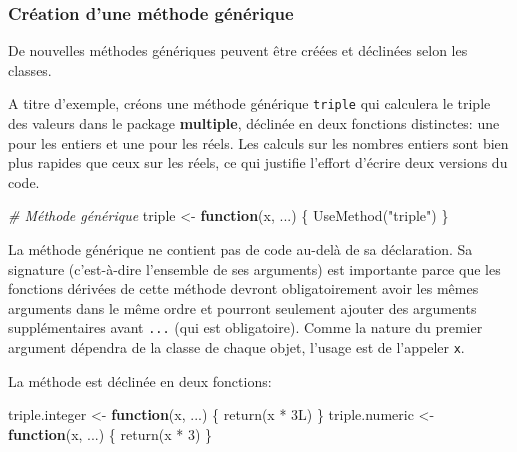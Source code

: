 \documentclass[
  11pt,
  french,
  a4paper,
  extrafontsizes,onecolumn,openright
  ]{memoir}
\newenvironment{Shaded}{\begin{snugshade}}{\end{snugshade}}
\newcommand{\CommentTok}[1]{\textcolor[rgb]{0.56,0.35,0.01}{\textit{#1}}}
\newcommand{\ControlFlowTok}[1]{\textcolor[rgb]{0.13,0.29,0.53}{\textbf{#1}}}
\newcommand{\DecValTok}[1]{\textcolor[rgb]{0.00,0.00,0.81}{#1}}
\newcommand{\FunctionTok}[1]{\textcolor[rgb]{0.00,0.00,0.00}{#1}}
\newcommand{\NormalTok}[1]{#1}
\newcommand{\OtherTok}[1]{\textcolor[rgb]{0.56,0.35,0.01}{#1}}
\newcommand{\SpecialCharTok}[1]{\textcolor[rgb]{0.00,0.00,0.00}{#1}}
\newcommand{\StringTok}[1]{\textcolor[rgb]{0.31,0.60,0.02}{#1}}
\begin{document}
\hypertarget{cruxe9ation-dune-muxe9thode-guxe9nuxe9rique}{%
\subsubsection{Création d'une méthode générique}\label{cruxe9ation-dune-muxe9thode-guxe9nuxe9rique}}

De nouvelles méthodes génériques peuvent être créées et déclinées selon les classes.

A titre d'exemple, créons une méthode générique \texttt{triple} qui calculera le triple des valeurs dans le package \textbf{multiple}, déclinée en deux fonctions distinctes: une pour les entiers et une pour les réels.
Les calculs sur les nombres entiers sont bien plus rapides que ceux sur les réels, ce qui justifie l'effort d'écrire deux versions du code.

\scriptsize

\begin{Shaded}
\begin{Highlighting}[]
\CommentTok{\# Méthode générique}
\NormalTok{triple }\OtherTok{\textless{}{-}} \ControlFlowTok{function}\NormalTok{(x, ...) \{}
    \FunctionTok{UseMethod}\NormalTok{(}\StringTok{"triple"}\NormalTok{)}
\NormalTok{\}}
\end{Highlighting}
\end{Shaded}

\normalsize

La méthode générique ne contient pas de code au-delà de sa déclaration.
Sa signature (c'est-à-dire l'ensemble de ses arguments) est importante parce que les fonctions dérivées de cette méthode devront obligatoirement avoir les mêmes arguments dans le même ordre et pourront seulement ajouter des arguments supplémentaires avant \texttt{...} (qui est obligatoire).
Comme la nature du premier argument dépendra de la classe de chaque objet, l'usage est de l'appeler \texttt{x}.

La méthode est déclinée en deux fonctions:

\scriptsize

\begin{Shaded}
\begin{Highlighting}[]
\NormalTok{triple.integer }\OtherTok{\textless{}{-}} \ControlFlowTok{function}\NormalTok{(x, ...) \{}
    \FunctionTok{return}\NormalTok{(x }\SpecialCharTok{*}\NormalTok{ 3L)}
\NormalTok{\}}
\NormalTok{triple.numeric }\OtherTok{\textless{}{-}} \ControlFlowTok{function}\NormalTok{(x, ...) \{}
    \FunctionTok{return}\NormalTok{(x }\SpecialCharTok{*} \DecValTok{3}\NormalTok{)}
\NormalTok{\}}
\end{Highlighting}
\end{Shaded}
\end{document}
